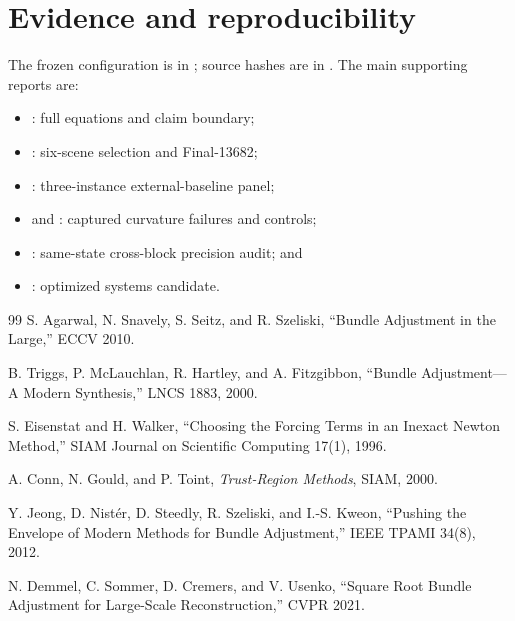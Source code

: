 \documentclass[11pt]{article}
\begin{document}
\section{Evidence and reproducibility}

The frozen configuration is in ; source hashes are in .  The main supporting reports are:

\begin{itemize}
  \item {}: full equations and claim boundary;
  \item {}: six-scene selection and Final-13682;
  \item {}: three-instance external-baseline panel;
  \item {} and : captured curvature failures and controls;
  \item {}: same-state cross-block precision audit; and
  \item {}: optimized systems candidate.
\end{itemize}

\begin{thebibliography}{99}
\small
{}
S. Agarwal, N. Snavely, S. Seitz, and R. Szeliski,
``Bundle Adjustment in the Large,'' ECCV 2010.

B. Triggs, P. McLauchlan, R. Hartley, and A. Fitzgibbon,
``Bundle Adjustment---A Modern Synthesis,'' LNCS 1883, 2000.

S. Eisenstat and H. Walker,
``Choosing the Forcing Terms in an Inexact Newton Method,''
SIAM Journal on Scientific Computing 17(1), 1996.

A. Conn, N. Gould, and P. Toint,
\emph{Trust-Region Methods}, SIAM, 2000.

Y. Jeong, D. Nist\'er, D. Steedly, R. Szeliski, and I.-S. Kweon,
``Pushing the Envelope of Modern Methods for Bundle Adjustment,''
IEEE TPAMI 34(8), 2012.

N. Demmel, C. Sommer, D. Cremers, and V. Usenko,
``Square Root Bundle Adjustment for Large-Scale Reconstruction,'' CVPR 2021.

\end{thebibliography}
\end{document}
